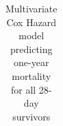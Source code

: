 \documentclass[final,10pt]{elsarticle}
\begin{document}
% 

\begin{table}[h]
\begin{tabular}{l c c}
\toprule

\bottomrule
\end{tabular}
\caption{Multivariate Cox Hazard model predicting one-year mortality for all 28-day survivors}
\label{tbl:all-comorb}
\end{table}

% 














\end{document}
